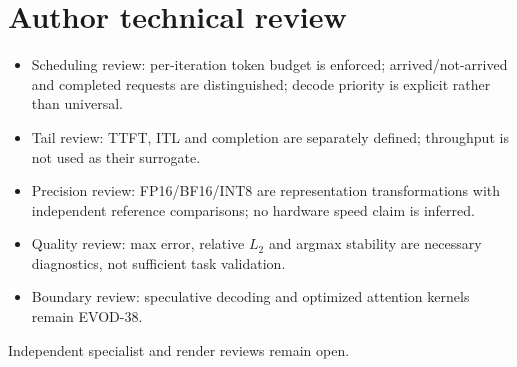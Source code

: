 \chapter*{Author technical review}
\begin{itemize}
\item Scheduling review: per-iteration token budget is enforced; arrived/not-arrived and completed requests are distinguished; decode priority is explicit rather than universal.
\item Tail review: TTFT, ITL and completion are separately defined; throughput is not used as their surrogate.
\item Precision review: FP16/BF16/INT8 are representation transformations with independent reference comparisons; no hardware speed claim is inferred.
\item Quality review: max error, relative $L_2$ and argmax stability are necessary diagnostics, not sufficient task validation.
\item Boundary review: speculative decoding and optimized attention kernels remain EVOD-38.
\end{itemize}
Independent specialist and render reviews remain open.

